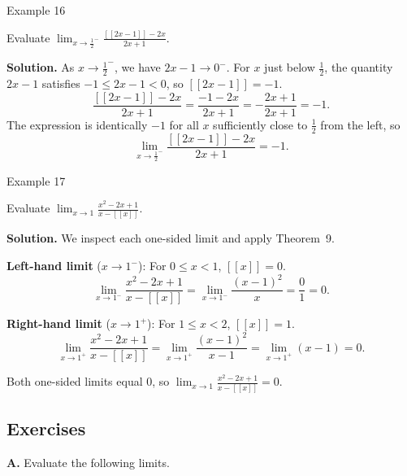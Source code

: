 \begin{examplebox}{Example 16}

Evaluate \(\displaystyle\lim_{x \to \frac{1}{2}^{-}} \frac{[\![2x - 1]\!] - 2x}{2x + 1}\).

\medskip
\textbf{Solution.}
As \(x \to \frac{1}{2}^{-}\), we have \(2x - 1 \to 0^{-}\). For \(x\) just below \(\frac{1}{2}\), the quantity \(2x - 1\) satisfies \(-1 \le 2x - 1 < 0\), so \([\![2x - 1]\!] = -1\).
\[
\frac{[\![2x - 1]\!] - 2x}{2x + 1}
    = \frac{-1 - 2x}{2x + 1}
    = -\frac{2x + 1}{2x + 1} = -1.
\]
The expression is identically \(-1\) for all \(x\) sufficiently close to \(\frac{1}{2}\) from the left, so
\[
\lim_{x \to \frac{1}{2}^{-}} \frac{[\![2x - 1]\!] - 2x}{2x + 1} = -1.
\]
\end{examplebox}


\begin{examplebox}{Example 17}

Evaluate \(\displaystyle\lim_{x \to 1} \frac{x^{2} - 2x + 1}{x - [\![x]\!]}\).

\medskip
\textbf{Solution.}
We inspect each one-sided limit and apply Theorem~9.

\textbf{Left-hand limit} (\(x \to 1^{-}\)): For \(0 \le x < 1\), \([\![x]\!] = 0\).
\[
\lim_{x \to 1^{-}} \frac{x^{2} - 2x + 1}{x - [\![x]\!]}
    = \lim_{x \to 1^{-}} \frac{(x - 1)^{2}}{x}
    = \frac{0}{1} = 0.
\]

\textbf{Right-hand limit} (\(x \to 1^{+}\)): For \(1 \le x < 2\), \([\![x]\!] = 1\).
\[
\lim_{x \to 1^{+}} \frac{x^{2} - 2x + 1}{x - [\![x]\!]}
    = \lim_{x \to 1^{+}} \frac{(x - 1)^{2}}{x - 1}
    = \lim_{x \to 1^{+}} (x - 1) = 0.
\]

Both one-sided limits equal 0, so \(\displaystyle\lim_{x \to 1} \frac{x^{2} - 2x + 1}{x - [\![x]\!]} = 0\).
\end{examplebox}

\pagebreak


\subsection*{Exercises}
\label{subsec:1.2.4}


\raggedcolumns
\setlength{\columnsep}{1.5em}

\medskip
\noindent\textbf{A.} Evaluate the following limits.

